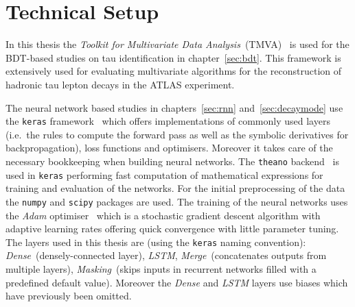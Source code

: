 \section{Technical Setup}
\label{sec:tech_setup}

In this thesis the \emph{Toolkit for Multivariate Data
  Analysis}~(TMVA)~\cite{tmva} is used for the BDT-based studies on tau
identification in chapter~\ref{sec:bdt}. This framework is extensively used for
evaluating multivariate algorithms for the reconstruction of hadronic tau lepton
decays in the ATLAS experiment.

The neural network based studies in chapters~\ref{sec:rnn}
and~\ref{sec:decaymode} use the \texttt{keras} framework~\cite{keras} which
offers implementations of commonly used layers (i.e.\ the rules to compute the
forward pass as well as the symbolic derivatives for backpropagation), loss
functions and optimisers. Moreover it takes care of the necessary bookkeeping
when building neural networks. The \texttt{theano} backend~\cite{theano} is used
in \texttt{keras} performing fast computation of mathematical expressions for
training and evaluation of the networks. For the initial preprocessing of the
data the \texttt{numpy} \cite{numpy} and \texttt{scipy} \cite{scipy} packages
are used. The training of the neural networks uses the \emph{Adam}
optimiser~\cite{adam} which is a stochastic gradient descent algorithm with
adaptive learning rates offering quick convergence with little parameter tuning.
The layers used in this thesis are (using the \texttt{keras} naming convention):
\emph{Dense}~(densely-connected layer), \emph{LSTM}, \emph{Merge}~(concatenates
outputs from multiple layers), \emph{Masking}~(skips inputs in recurrent
networks filled with a predefined default value). Moreover the \emph{Dense} and
\emph{LSTM} layers use biases which have previously been omitted.

